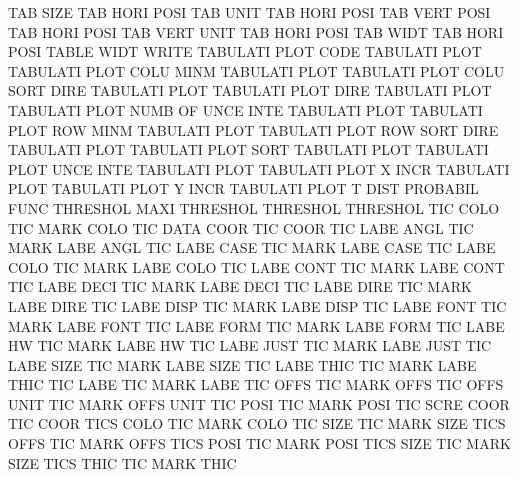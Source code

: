 TAB      SIZE                           TAB HORI POSI
TAB      UNIT                           TAB HORI POSI
TAB      VERT POSI                      TAB HORI POSI
TAB      VERT UNIT                      TAB HORI POSI
TAB      WIDT                           TAB HORI POSI
TABLE    WIDT                           WRITE
TABULATI PLOT CODE                      TABULATI PLOT
TABULATI PLOT COLU MINM                 TABULATI PLOT
TABULATI PLOT COLU SORT DIRE            TABULATI PLOT
TABULATI PLOT DIRE                      TABULATI PLOT
TABULATI PLOT NUMB OF   UNCE INTE       TABULATI PLOT
TABULATI PLOT ROW  MINM                 TABULATI PLOT
TABULATI PLOT ROW  SORT DIRE            TABULATI PLOT
TABULATI PLOT SORT                      TABULATI PLOT
TABULATI PLOT UNCE INTE                 TABULATI PLOT
TABULATI PLOT X    INCR                 TABULATI PLOT
TABULATI PLOT Y    INCR                 TABULATI PLOT
T        DIST                           PROBABIL FUNC
THRESHOL MAXI                           THRESHOL
THRESHOL                                THRESHOL
TIC      COLO                           TIC      MARK COLO
TIC      DATA COOR                      TIC      COOR
TIC      LABE ANGL                      TIC      MARK LABE ANGL
TIC      LABE CASE                      TIC      MARK LABE CASE
TIC      LABE COLO                      TIC      MARK LABE COLO
TIC      LABE CONT                      TIC      MARK LABE CONT
TIC      LABE DECI                      TIC      MARK LABE DECI
TIC      LABE DIRE                      TIC      MARK LABE DIRE
TIC      LABE DISP                      TIC      MARK LABE DISP
TIC      LABE FONT                      TIC      MARK LABE FONT
TIC      LABE FORM                      TIC      MARK LABE FORM
TIC      LABE HW                        TIC      MARK LABE HW
TIC      LABE JUST                      TIC      MARK LABE JUST
TIC      LABE SIZE                      TIC      MARK LABE SIZE
TIC      LABE THIC                      TIC      MARK LABE THIC
TIC      LABE                           TIC      MARK LABE
TIC      OFFS                           TIC      MARK OFFS
TIC      OFFS UNIT                      TIC      MARK OFFS UNIT
TIC      POSI                           TIC      MARK POSI
TIC      SCRE COOR                      TIC      COOR
TICS     COLO                           TIC      MARK COLO
TIC      SIZE                           TIC      MARK SIZE
TICS     OFFS                           TIC      MARK OFFS
TICS     POSI                           TIC      MARK POSI
TICS     SIZE                           TIC      MARK SIZE
TICS     THIC                           TIC      MARK THIC
